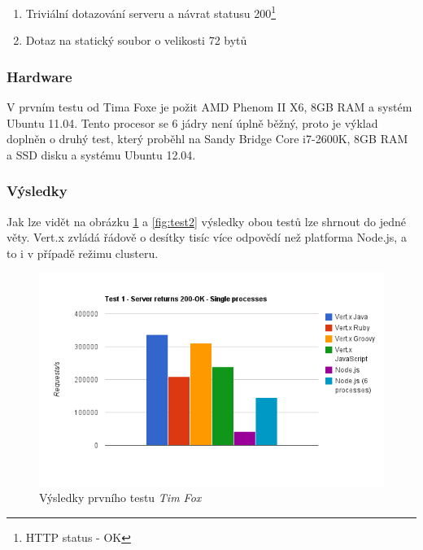 \begin{enumerate}
\item{Triviální dotazování serveru a návrat statusu 200\footnote{HTTP status - OK}}
\item{Dotaz na statický soubor o velikosti 72 bytů}
\end{enumerate}

\subsubsection{Hardware}

V prvním testu od Tima Foxe je požit  AMD Phenom II X6, 8GB RAM a systém Ubuntu 11.04. Tento procesor se 6 jádry není úplně běžný, proto je výklad doplněn o druhý test, který proběhl na Sandy Bridge Core i7-2600K, 8GB RAM a SSD disku a systému Ubuntu 12.04.

\subsubsection{Výsledky}

Jak lze vidět na obrázku \ref{fig:test1} a \ref{fig:test2} výsledky obou testů lze shrnout do jedné věty. Vert.x zvládá řádově o desítky tisíc více odpovědí než platforma Node.js, a to i v případě režimu clusteru.

\begin{figure}[h]
\begin{centering}
\includegraphics[scale=0.7]{obrazky/chart_1}
\par\end{centering}
\caption{Výsledky prvního testu \emph{Tim Fox} \cite{benchmarkTim}\label{fig:test1}}
\end{figure}

